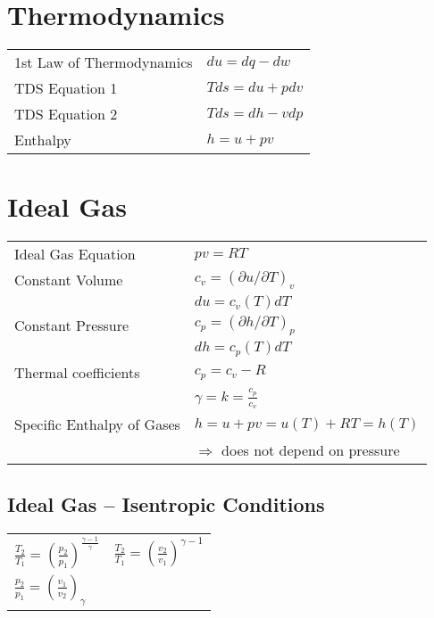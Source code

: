 




\section*{Thermodynamics}
\begin{tabular}{ m{5cm} l}
    1st Law of Thermodynamics & $du = dq - dw$  \\
    TDS Equation 1 & $Tds = du + pdv$ \\
    TDS Equation 2 & $Tds = dh - vdp$ \\
    Enthalpy & $h = u + pv$
\end{tabular}

\section*{Ideal Gas}
\begin{tabular}{ m{5cm} l}
    Ideal Gas Equation & $pv = RT$ \\
    Constant Volume & $c_v = (\partial u / \partial T)_v$ \\
     & $du = c_v (T) dT$ \\
     Constant Pressure & $c_p = (\partial h / \partial T)_p$ \\
     & $dh = c_p (T) dT$ \\
     Thermal coefficients & $c_p = c_v - R$ \\
      & $\gamma = k = \frac{c_p}{c_v}$ \\
      Specific Enthalpy of Gases & $h = u + pv = u(T) + RT = h(T)$ \\
       & $\Rightarrow$ does not depend on pressure
\end{tabular}

\subsection*{Ideal Gas – Isentropic Conditions}
\begin{tabular}{ m{5cm} l}
    $\frac{T_2}{T_1} = \left( \frac{p_2}{p_1} \right)^{ \frac{\gamma - 1}{\gamma}} $ & $\frac{T_2}{T_1} = \left( \frac{v_2}{v_1} \right)^{ \gamma -1 } $ \\
    $\frac{p_2}{p_1} = \left( \frac{v_1}{v_2} \right)_{ \gamma } $ & \\
\end{tabular}



